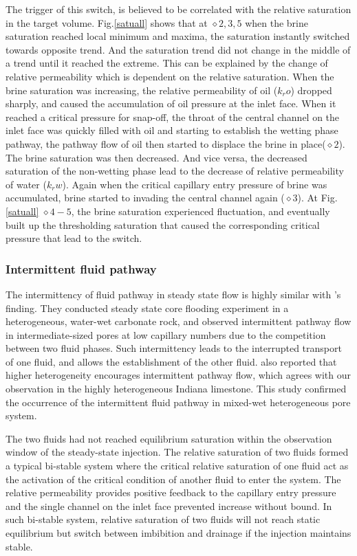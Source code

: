The trigger of this switch, is believed to be correlated with the relative saturation in the target volume. Fig.\ref{satuall} shows that at $\diamond2,3,5$ when the brine saturation reached local minimum and maxima, the saturation instantly switched towards opposite trend. And the saturation trend did not change in the middle of a trend until it reached the extreme. This can be explained by the change of relative permeability which is dependent on the relative saturation. When the brine saturation was increasing, the relative permeability of oil ($k_ro$) dropped sharply, and caused the accumulation of oil pressure at the inlet face. When it reached a critical pressure for snap-off, the throat of the central channel on the inlet face was quickly filled with oil and starting to establish the wetting phase pathway, the pathway flow of oil then started to displace the brine in place($\diamond2$). The brine saturation was then decreased. And vice versa, the decreased saturation of the non-wetting phase lead to the decrease of relative permeability of water ($k_rw$). Again when the critical capillary entry pressure of brine was accumulated, brine started to invading the central channel again ($\diamond3$). At Fig.\ref{satuall} $\diamond4-5$, the brine saturation experienced fluctuation, and eventually built up the thresholding saturation that caused the corresponding critical pressure that lead to the switch.

\subsubsection{Intermittent fluid pathway}
The intermittency of fluid pathway in steady state flow is highly similar with \citet{spurin2019intermittent}'s finding. They conducted steady state core flooding experiment in a heterogeneous, water-wet carbonate rock, and observed intermittent pathway flow in intermediate-sized pores at low capillary numbers due to the competition between two fluid phases. Such intermittency leads to the interrupted transport of one fluid, and allows the establishment of the other fluid. \citet{spurin2019intermittent} also reported that higher heterogeneity encourages intermittent pathway flow, which agrees with our observation in the highly heterogeneous Indiana limestone. This study confirmed the occurrence of the intermittent fluid pathway in mixed-wet heterogeneous pore system.

The two fluids had not reached equilibrium saturation within the observation window of the steady-state injection. The relative saturation of two fluids formed a typical bi-stable system where the critical relative saturation of one fluid act as the activation of the critical condition of another fluid to enter the system. The relative permeability provides positive feedback to the capillary entry pressure and the single channel on the inlet face prevented increase without bound. In such bi-stable system, relative saturation of two fluids will not reach static equilibrium but switch between imbibition and drainage if the injection maintains stable.


